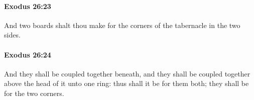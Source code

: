 		\paragraph{Exodus 26:23} %
			\label{EXODUS-26-23}

			And two boards shalt thou make for the corners of the tabernacle in the two sides.


		\paragraph{Exodus 26:24} %
			\label{EXODUS-26-24}

			And they shall be coupled together beneath, and they shall be coupled together above the head of it unto one ring: thus shall it be for them both; they shall be for the two corners.


